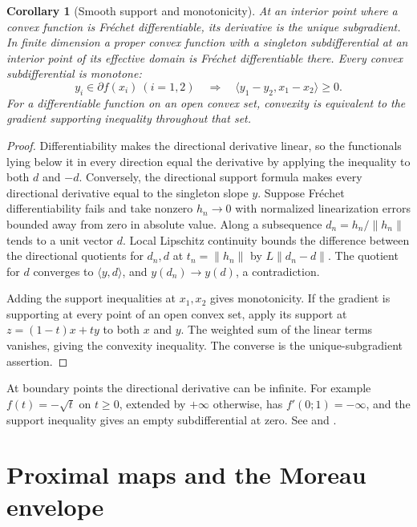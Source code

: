 \documentclass[11pt,oneside,openany]{book}
\theoremstyle{plain}
\newtheorem{corollary}[theorem]{Corollary}
\theoremstyle{definition}
\theoremstyle{remark}
\begin{document}
\begin{corollary}[Smooth support and monotonicity]
\label{cor:convex-differentiability}
At an interior point where a convex function is Fr\'echet
differentiable, its derivative is the unique subgradient.
In finite dimension a proper convex function with a singleton
subdifferential at an interior point of its effective domain
is Fr\'echet differentiable there. Every convex subdifferential
is monotone:
\[
 y_i\in\partial f(x_i)\ (i=1,2)
 \quad\Longrightarrow\quad
 \langle y_1-y_2,x_1-x_2\rangle\ge0 .
\]
For a differentiable function on an open convex set,
convexity is equivalent to the gradient supporting inequality
throughout that set.
\end{corollary}

\begin{proof}
Differentiability makes the directional derivative linear,
so the functionals lying below it in every direction equal
the derivative by applying the inequality to both \(d\) and
\(-d\). Conversely, the directional support formula makes
every directional derivative equal to the singleton slope
\(y\). Suppose Fr\'echet differentiability fails and take
nonzero \(h_n\to0\) with normalized linearization errors
bounded away from zero in absolute value. Along a subsequence
\(d_n=h_n/\lVert h_n\rVert\) tends to a unit vector \(d\).
Local Lipschitz continuity bounds the difference between the
directional quotients for \(d_n,d\) at \(t_n=\lVert h_n\rVert\)
by \(L\lVert d_n-d\rVert\).
The quotient for \(d\) converges to \(\langle y,d\rangle\),
and \(y(d_n)\to y(d)\), a contradiction.

Adding the support inequalities at \(x_1,x_2\) gives
monotonicity. If the gradient is supporting at every point
of an open convex set, apply its support at
\(z=(1-t)x+ty\) to both \(x\) and \(y\). The weighted sum
of the linear terms vanishes, giving the convexity inequality.
The converse is the unique-subgradient assertion.
\end{proof}

At boundary points the directional derivative can be infinite.
For example \(f(t)=-\sqrt t\) on \(t\ge0\), extended by
\(+\infty\) otherwise, has \(f'(0;1)=-\infty\), and the
support inequality gives an empty subdifferential at zero.
See \cite[Theorems 23.2, 23.4 and 25.1]{Rockafellar}
and \cite[Chapter I, \S5]{EkelandTemam}.

\section{Proximal maps and the Moreau envelope}\label{v02-08}
\end{document}
